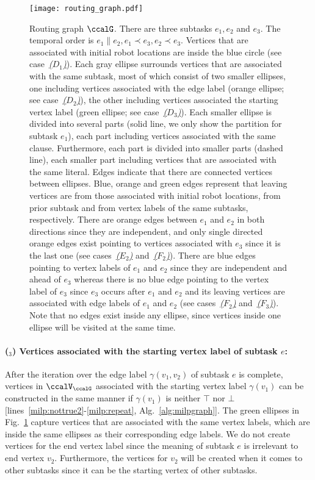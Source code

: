 \documentclass[Afour,sageh,times]{sagej}
\newcounter{mycounter}
\begin{document}
\begin{figure}[!t]
  \centering
  \texttt{[image: routing\_graph.pdf]}
  \caption{Routing graph $\ccalG$. There are three subtasks $e_1, e_2$ and $e_3$. The temporal order is $e_1 \| e_2, e_1 \prec e_3, e_2 \prec e_3$.    Vertices that are associated with initial robot locations are inside the blue circle (see case~\hyperref[vertex:initial]{\it ($D_1$)}). Each gray ellipse surrounds vertices that are associated with the same subtask, most of which consist of two smaller ellipses, one including vertices associated with the edge label (orange ellipse; see case~\hyperref[vertex:edge]{\it ($D_2$)}), the other including vertices associated the starting vertex label (green ellipse; see case~\hyperref[vertex:vertex]{\it ($D_3$)}).  Each smaller ellipse is divided into several parts (solid line, we only show the partition for subtask $e_1$), each part including vertices associated with the same clause. Furthermore, each part is divided into smaller parts (dashed line), each smaller part including vertices that are associated with the same literal.
    Edges indicate that there are connected vertices between  ellipses. Blue, orange and green  edges represent that leaving vertices are from those associated with initial robot locations, from  prior subtask and from vertex labels of the same subtasks, respectively. There are orange edges between $e_1$ and $e_2$ in both directions since they are independent, and only single directed orange edges exist pointing to vertices associated with $e_3$ since it is the last one {(see cases~\hyperref[sec:b]{\it ($E_2$)} and~\hyperref[edge:vertex2]{\it ($F_2$)})}. There are blue edges pointing to vertex labels of $e_1$ and $e_2$ since they are independent and ahead of $e_3$  whereas there is no blue edge pointing to the vertex label of $e_3$ since $e_3$ occurs after $e_1$ and $e_2$ and its leaving vertices are associated with  edge labels of $e_1$ and $e_2$ (see cases~\hyperref[edge:vertex2]{\it ($F_2$)} and~\hyperref[edge:vertex3]{\it ($F_3$)}).  Note that no edges exist inside any ellipse, since vertices inside one ellipse will be visited at the same time.}
  \label{fig:routing}
\end{figure}
\paragraph{($_3$) Vertices associated with the starting vertex label of subtask $e$:}\label{vertex:vertex} After the iteration over the edge label $\gamma(v_1, v_2)$ of subtask $e$ is complete, vertices in $\ccalV_\ccalG$ associated with the starting  vertex label $\gamma(v_1)$ can be constructed in the same manner if $\gamma(v_1)$ is neither $\top$ nor $\bot$ [lines~\ref{milp:nottrue2}-\ref{milp:repeat}, Alg.~\ref{alg:milpgraph}]. The green ellipses in Fig.~\ref{fig:routing} capture vertices that are associated with the same vertex labels, which are inside the same ellipses as their corresponding edge labels. We do not create vertices for the end vertex label since the meaning of subtask $e$ is irrelevant to end vertex $v_2$. Furthermore, the vertices for $v_2$ will be created when it comes to other subtasks since it can be the starting vertex of other subtasks.
\end{document}
